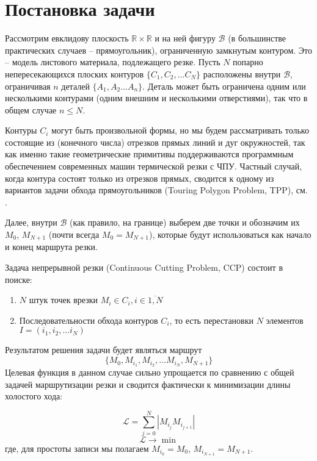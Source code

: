 
\section{Постановка задачи}
\label{sec:ccp.stmt}

Рассмотрим евклидову плоскость
$\mathbb R \times \mathbb R$
и на ней фигуру
$\mathcal B$
(в большинстве практических случаев -- прямоугольник),
ограниченную замкнутым контуром.
Это -- модель листового материала,
подлежащего резке.
Пусть
$N$
попарно непересекающихся плоских контуров
$\{C_1, C_2, ... C_N\}$
расположены внутри
$\mathcal B$,
ограничивая
$n$
деталей
$\{A_1, A_2 ... A_n\}$.
Деталь может быть ограничена
одним или несколькими контурами
(одним внешним и несколькими отверстиями),
так что в общем случае
$n \leqslant N$.

Контуры
$C_i$
могут быть произвольной формы,
но мы будем рассматривать только
состоящие из
(конечного числа)
отрезков прямых линий и дуг окружностей,
так как именно такие геометрические примитивы
поддерживаются программным обеспечением
современных машин термической резки с ЧПУ.
Частный случай,
когда контура состоят только
из отрезков прямых,
сводится к одному из вариантов
задачи обхода прямоугольников
(Touring Polygon Problem, TPP),
см.
\cite{bi:TPP}.

Далее,
внутри
$\mathcal B$
(как правило, на границе)
выберем две точки и обозначим их
$M_0$, $M_{N + 1}$
(почти всегда $M_0 = M_{N + 1}$),
которые будут использоваться
как начало и конец
маршрута резки.

Задача непрерывной резки
(Continuous Cutting Problem, CCP)
состоит в поиске:
\begin{enumerate}
\item
$N$ штук точек врезки $M_i \in C_i, i \in \overline{1, N}$
\item
Последовательности обхода контуров
$C_i$,
то есть перестановки
$N$
элементов
$I = (i_1, i_2, ... i_N)$
\end{enumerate}

Результатом решения задачи будет являться маршрут
\begin{equation}
  \{M_0, M_{i_1}, M_{i_2}, \dots M_{i_N}, M_{N + 1}\}
\end{equation}
Целевая функция в данном случае сильно упрощается
по сравнению с общей задачей маршрутизации резки
и сводится фактически к минимизации длины холостого хода:

\begin{equation}
  \mathcal{L} = \sum_{j=0}^N|M_{i_j}M_{i_{j+1}}|
  \label{air-move-length}
\end{equation}
$$
\mathcal{L} \to \min
$$
где, для простоты записи мы полагаем
$M_{i_0} = M_0$,
$M_{i_{N + 1}} = M_{N + 1}$.

